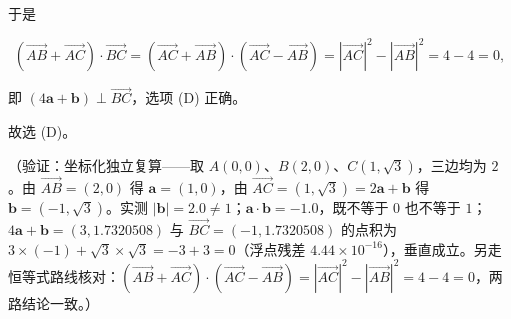 \begin{answer}
于是

\nopagebreak[4]
\[ (\overrightarrow{AB}+\overrightarrow{AC})\cdot\overrightarrow{BC}=(\overrightarrow{AC}+\overrightarrow{AB})\cdot(\overrightarrow{AC}-\overrightarrow{AB})=|\overrightarrow{AC}|^{2}-|\overrightarrow{AB}|^{2}=4-4=0, \]

即 \((4\boldsymbol{a}+\boldsymbol{b})\perp\overrightarrow{BC}\)，选项 (D) 正确。

故选 (D)。

（验证：坐标化独立复算——取 \(A(0,0)\)、\(B(2,0)\)、\(C(1,\sqrt{3})\)，三边均为 \(2\)。由 \(\overrightarrow{AB}=(2,0)\) 得 \(\boldsymbol{a}=(1,0)\)，由 \(\overrightarrow{AC}=(1,\sqrt{3})=2\boldsymbol{a}+\boldsymbol{b}\) 得 \(\boldsymbol{b}=(-1,\sqrt{3})\)。实测 \(|\boldsymbol{b}|=2.0\neq1\)；\(\boldsymbol{a}\cdot\boldsymbol{b}=-1.0\)，既不等于 \(0\) 也不等于 \(1\)；\(4\boldsymbol{a}+\boldsymbol{b}=(3,1.7320508)\) 与 \(\overrightarrow{BC}=(-1,1.7320508)\) 的点积为 \(3\times(-1)+\sqrt{3}\times\sqrt{3}=-3+3=0\)（浮点残差 \(4.44\times10^{-16}\)），垂直成立。另走恒等式路线核对：\((\overrightarrow{AB}+\overrightarrow{AC})\cdot(\overrightarrow{AC}-\overrightarrow{AB})=|\overrightarrow{AC}|^{2}-|\overrightarrow{AB}|^{2}=4-4=0\)，两路结论一致。）


\end{answer}
